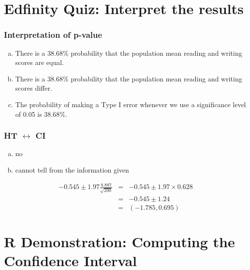 \documentclass[slidestop,compress,mathserif]{beamer}
\newcommand{\soln}[1]{\textit{#1}}
\begin{document}

\section{Edfinity Quiz: Interpret the results}  %


\begin{frame}
\frametitle{Interpretation of p-value}


\begin{enumerate}[(a)]
\item There is a 38.68\% probability that the population mean reading and writing scores are equal.
\item There is a 38.68\% probability that the population mean reading and writing scores differ.
\item The probability of making a Type I error whenever we use a significance level of 0.05 is 38.68\%.
\end{enumerate}

\end{frame}


\begin{frame}
\frametitle{HT $\leftrightarrow$ CI}


\begin{enumerate}[(a)]
\item no
\item cannot tell from the information given
\end{enumerate}

\soln{\pause
\begin{eqnarray*} 
-0.545 \pm 1.97 \frac{8.887}{\sqrt{200}} &=& -0.545 \pm 1.97 \times 0.628 \\
&=& -0.545 \pm 1.24 \\
&=& (-1.785, 0.695)
\end{eqnarray*}
}

\end{frame}


\section{R Demonstration: Computing the Confidence Interval} 






\end{document}
